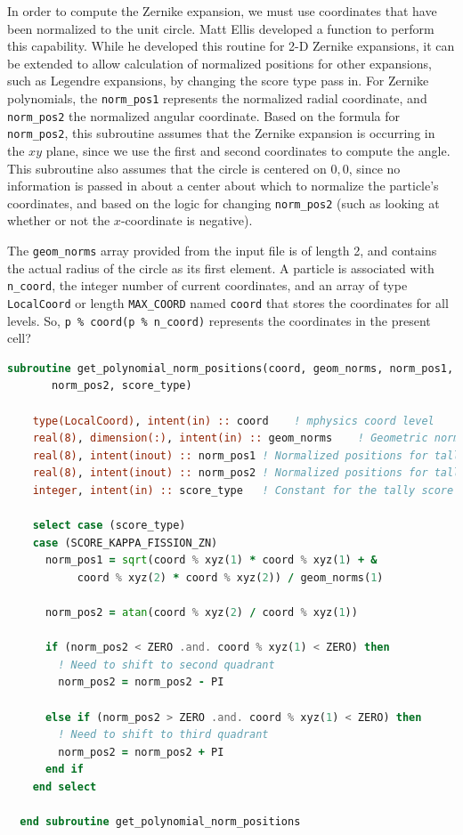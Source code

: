 \documentclass[10pt]{article}
\numberwithin{equation}{section} %
\begin{document}
In order to compute the Zernike expansion, we must use coordinates that have been normalized to the unit circle. Matt Ellis developed a function to perform this capability. While he developed this routine for 2-D Zernike expansions, it can be extended to allow calculation of normalized positions for other expansions, such as Legendre expansions, by changing the score type pass in. For Zernike polynomials, the {\tt norm\_pos1} represents the normalized radial coordinate, and {\tt norm\_pos2} the normalized angular coordinate. Based on the formula for {\tt norm\_pos2}, this subroutine assumes that the Zernike expansion is occurring in the \(xy\) plane, since we use the first and second coordinates to compute the angle. This subroutine also assumes that the circle is centered on \(0,0\), since no information is passed in about a center about which to normalize the particle's coordinates, and based on the logic for changing {\tt norm\_pos2} (such as looking at whether or not the \(x\)-coordinate is negative). 

The {\tt geom\_norms} array provided from the input file is of length 2, and contains the actual radius of the circle as its first element. A particle is associated with {\tt n\_coord}, the integer number of current coordinates, and an array of type {\tt LocalCoord} or length {\tt MAX\_COORD} named {\tt coord} that stores the coordinates for all levels. So, {\tt p \% coord(p \% n\_coord)} represents the coordinates in the present cell? 

\begin{lstlisting}[language=Fortran]
  subroutine get_polynomial_norm_positions(coord, geom_norms, norm_pos1, &
       norm_pos2, score_type)

    type(LocalCoord), intent(in) :: coord    ! mphysics coord level
    real(8), dimension(:), intent(in) :: geom_norms    ! Geometric norms for calculation
    real(8), intent(inout) :: norm_pos1 ! Normalized positions for tally
    real(8), intent(inout) :: norm_pos2 ! Normalized positions for tally
    integer, intent(in) :: score_type   ! Constant for the tally score type

    select case (score_type)
    case (SCORE_KAPPA_FISSION_ZN)
      norm_pos1 = sqrt(coord % xyz(1) * coord % xyz(1) + &
           coord % xyz(2) * coord % xyz(2)) / geom_norms(1)
           
      norm_pos2 = atan(coord % xyz(2) / coord % xyz(1))
      
      if (norm_pos2 < ZERO .and. coord % xyz(1) < ZERO) then
        ! Need to shift to second quadrant
        norm_pos2 = norm_pos2 - PI
        
      else if (norm_pos2 > ZERO .and. coord % xyz(1) < ZERO) then
        ! Need to shift to third quadrant
        norm_pos2 = norm_pos2 + PI
      end if
    end select

  end subroutine get_polynomial_norm_positions
\end{lstlisting}
\end{document}
